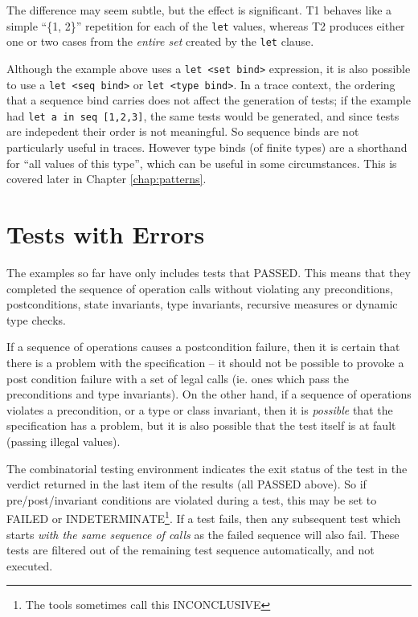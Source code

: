\documentclass{overturerepchap}
\begin{document}
The difference may seem subtle, but the effect is significant. T1 behaves like a
simple ``\{1, 2\}'' repetition for each of the \texttt{let} values, whereas T2
produces either one or two cases from the \emph{entire set} created by the \texttt{let}
clause.

Although the example above uses a \texttt{let <set bind>} expression, it is also
possible to use a \texttt{let <seq bind>} or \texttt{let <type bind>}. In a
trace context, the ordering that a sequence bind carries does not affect the
generation of tests; if the example had \texttt{let a in seq [1,2,3]}, the
same tests would be generated, and since tests are indepedent their order is not
meaningful. So sequence binds are not particularly useful in traces. However
type binds (of finite types) are a shorthand for ``all values of this type'',
which can be useful in some circumstances. This is covered later in Chapter
\ref{chap:patterns}.

\section{Tests with Errors}

The examples so far have only includes tests that PASSED. This means that they
completed the sequence of operation calls without violating any preconditions,
postconditions, state invariants, type invariants, recursive measures or dynamic
type checks.

If a sequence of operations causes a postcondition failure, then it
is certain that there is a problem with the specification – it should not be
possible to provoke a post condition failure with a set of legal calls (ie. ones
which pass the preconditions and type invariants). On the other hand, if a 
sequence of operations violates a precondition, or a type or class invariant, 
then it is \emph{possible} that the specification has a problem, but it is also 
possible that the test itself is at fault (passing illegal values).

The combinatorial testing environment indicates the exit status of the test  in
the verdict returned in the last item of the results (all PASSED above). So if 
pre/post/invariant conditions are violated during a test, this may be set to 
FAILED or INDETERMINATE\footnote{The tools sometimes call this INCONCLUSIVE}. If
a test fails, then any subsequent test which starts \emph{with the same
sequence of calls} as the failed sequence will also fail. These tests are
filtered out of the remaining test sequence automatically, and not executed.
\end{document}
